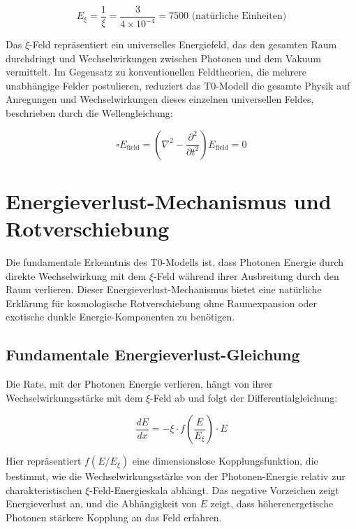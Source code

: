 \begin{equation}
	E_\xi = \frac{1}{\xi} = \frac{3}{4 \times 10^{-4}} = 7500 \text{ (natürliche Einheiten)}
\end{equation}
	
	Das $\xi$-Feld repräsentiert ein universelles Energiefeld, das den gesamten Raum durchdringt und Wechselwirkungen zwischen Photonen und dem Vakuum vermittelt. Im Gegensatz zu konventionellen Feldtheorien, die mehrere unabhängige Felder postulieren, reduziert das T0-Modell die gesamte Physik auf Anregungen und Wechselwirkungen dieses einzelnen universellen Feldes, beschrieben durch die Wellengleichung:
	
	\begin{equation}
		\square E_{\text{field}} = \left(\nabla^2 - \frac{\partial^2}{\partial t^2}\right) E_{\text{field}} = 0
	\end{equation}
	
	\section{Energieverlust-Mechanismus und Rotverschiebung}
	
	Die fundamentale Erkenntnis des T0-Modells ist, dass Photonen Energie durch direkte Wechselwirkung mit dem $\xi$-Feld während ihrer Ausbreitung durch den Raum verlieren. Dieser Energieverlust-Mechanismus bietet eine natürliche Erklärung für kosmologische Rotverschiebung ohne Raumexpansion oder exotische dunkle Energie-Komponenten zu benötigen.
	
	\subsection{Fundamentale Energieverlust-Gleichung}
	
	Die Rate, mit der Photonen Energie verlieren, hängt von ihrer Wechselwirkungsstärke mit dem $\xi$-Feld ab und folgt der Differentialgleichung:
	
	\begin{equation}
		\frac{dE}{dx} = -\xi \cdot f\left(\frac{E}{E_\xi}\right) \cdot E
	\end{equation}
	
	Hier repräsentiert $f(E/E_\xi)$ eine dimensionslose Kopplungsfunktion, die bestimmt, wie die Wechselwirkungsstärke von der Photonen-Energie relativ zur charakteristischen $\xi$-Feld-Energieskala abhängt. Das negative Vorzeichen zeigt Energieverlust an, und die Abhängigkeit von $E$ zeigt, dass höherenergetische Photonen stärkere Kopplung an das Feld erfahren.
	
